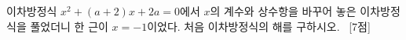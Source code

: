 이차방정식 $x^2+(a+2)x+2a=0$에서 $x$의 계수와 상수항을 바꾸어 놓은 이차방정식을 풀었더니 한 근이 $x=-1$이었다. 처음 이차방정식의 해를 구하시오. ~\mbox{\mbox{[7점]}}
